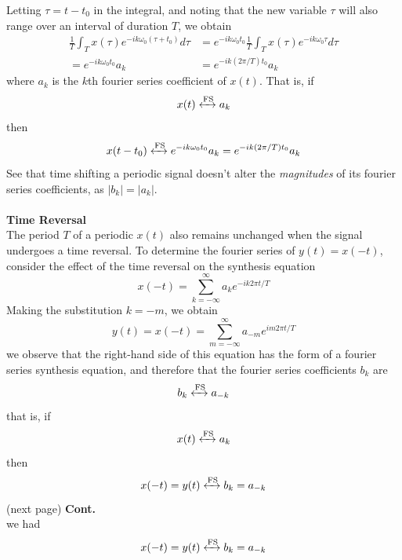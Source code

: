 \documentclass{report}
\begin{document}
Letting $\tau=t-t_0$ in the integral, and noting that the new variable $\tau$ will also range over an interval of duration $T$, we obtain
\begin{align*}
\frac{1}{T}\int_Tx(\tau)e^{-ik\omega_0(\tau+t_0)}d\tau&=
e^{-ik\omega_0t_0}\frac{1}{T}\int_Tx(\tau)e^{-ik\omega_0\tau}d\tau\\
=e^{-ik\omega_0t_0}a_k&=e^{-ik(2\pi/T)t_0}a_k
\end{align*}
where $a_k$ is the $k$th fourier series coefficient of $x(t)$. That is, if
\begin{equation*}
x(t)\xleftrightarrow[]{\text{FS}}a_k
\end{equation*}
then
\begin{equation*}
x(t-t_0)\xleftrightarrow[]{\text{FS}}e^{-ik\omega_0t_0}a_k=e^{-ik(2\pi/T)t_0}a_k
\end{equation*}
See that time shifting a periodic signal doesn't alter the \textit{magnitudes} of its fourier series coefficients, as $|b_k|=|a_k|$.\\
\vspace{1mm}\\
\textbf{Time Reversal}\\
The period $T$ of a periodic $x(t)$ also remains unchanged when the signal undergoes a time reversal. To determine the fourier series of $y(t)=x(-t)$, consider the effect of the time reversal
on the synthesis equation
\begin{equation*}
x(-t)=\sum^\infty_{k=-\infty}a_ke^{-ik2\pi t/T}
\end{equation*}
Making the substitution $k=-m$, we obtain
\begin{equation*}
y(t)=x(-t)=\sum^\infty_{m=-\infty}a_{-m}e^{im2\pi t/T}
\end{equation*}
we observe that the right-hand side of this equation has the form of a fourier series synthesis equation, and therefore that the fourier series coefficients $b_k$ are
\begin{equation*}
b_k\xleftrightarrow[]{\text{FS}}a_{-k}
\end{equation*}
that is, if 
\begin{equation*}
x(t)\xleftrightarrow[]{\text{FS}}a_k
\end{equation*}
then
\begin{equation*}
x(-t)=y(t)\xleftrightarrow[]{\text{FS}}b_k=a_{-k}
\end{equation*}
(next page)\newpage
\noindent\textbf{Cont.}\\
we had
\begin{equation*}
x(-t)=y(t)\xleftrightarrow[]{\text{FS}}b_k=a_{-k}
\end{equation*}
\end{document}
